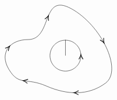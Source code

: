 \documentclass[12pt]{article}
\begin{document}
\begin{theorem}
\[\begin{tikzpicture}[x=0.75pt,y=0.75pt,yscale=-0.7,xscale=.7]
        \draw    (194.26,120.76) .. controls (252.26,120.76) and (224.42,9.55) .. (295.26,48) .. controls (366.09,86.45) and (416.73,192.41) .. (376.26,222.76) .. controls (335.78,253.12) and (285.26,250.76) .. (237.26,229.76) .. controls (189.26,208.76) and (173.26,230.64) .. (149.26,190.64) .. controls (125.26,150.64) and (153.26,120.51) .. (194.26,120.76) -- cycle ;
        \draw [shift={(242.18,64.55)}, rotate = 112.47] [color=black  ][line width=0.75]    (10.93,-4.9) .. controls (6.95,-2.3) and (3.31,-0.67) .. (0,0) .. controls (3.31,0.67) and (6.95,2.3) .. (10.93,4.9)   ;
        \draw [shift={(372.72,128.93)}, rotate = 240.89] [color=black  ][line width=0.75]    (10.93,-4.9) .. controls (6.95,-2.3) and (3.31,-0.67) .. (0,0) .. controls (3.31,0.67) and (6.95,2.3) .. (10.93,4.9)   ;
        \draw [shift={(301.73,245.48)}, rotate = 0.74] [color=black  ][line width=0.75]    (10.93,-4.9) .. controls (6.95,-2.3) and (3.31,-0.67) .. (0,0) .. controls (3.31,0.67) and (6.95,2.3) .. (10.93,4.9)   ;
        \draw [shift={(182.71,217.06)}, rotate = 8.82] [color=black  ][line width=0.75]    (10.93,-4.9) .. controls (6.95,-2.3) and (3.31,-0.67) .. (0,0) .. controls (3.31,0.67) and (6.95,2.3) .. (10.93,4.9)   ;
        \draw [shift={(151.34,135.99)}, rotate = 130.63] [color=black  ][line width=0.75]    (10.93,-4.9) .. controls (6.95,-2.3) and (3.31,-0.67) .. (0,0) .. controls (3.31,0.67) and (6.95,2.3) .. (10.93,4.9)   ;
        \draw  [draw opacity=0] (318.31,158.43) .. controls (318.31,158.43) and (318.31,158.43) .. (318.31,158.43) .. controls (318.31,178.47) and (302.06,194.72) .. (282.02,194.72) .. controls (261.97,194.72) and (245.73,178.47) .. (245.73,158.43) .. controls (245.73,138.38) and (261.97,122.13) .. (282.02,122.13) .. controls (301.85,122.13) and (317.96,138.04) .. (318.3,157.79) -- (282.02,158.43) -- cycle ; \draw    (318.31,158.43) .. controls (318.31,158.43) and (318.31,158.43) .. (318.31,158.43) .. controls (318.31,178.47) and (302.06,194.72) .. (282.02,194.72) .. controls (261.97,194.72) and (245.73,178.47) .. (245.73,158.43) .. controls (245.73,138.38) and (261.97,122.13) .. (282.02,122.13) .. controls (301.25,122.13) and (316.99,137.1) .. (318.23,156.03) ; \draw [shift={(318.23,156.03)}, rotate = 89.02] [color=black  ][line width=0.75]    (10.93,-4.9) .. controls (6.95,-2.3) and (3.31,-0.67) .. (0,0) .. controls (3.31,0.67) and (6.95,2.3) .. (10.93,4.9)   ; 
        \draw    (282.02,121.14) -- (282.02,158.43) ;

\end{tikzpicture}\]
\end{theorem}
\end{document}
